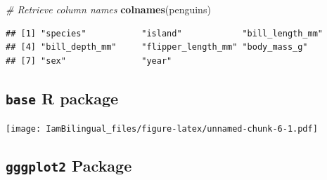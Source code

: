 \documentclass[]{book}
\newenvironment{Shaded}{\begin{snugshade}}{\end{snugshade}}
\newcommand{\CommentTok}[1]{\textcolor[rgb]{0.56,0.35,0.01}{\textit{#1}}}
\newcommand{\DataTypeTok}[1]{\textcolor[rgb]{0.13,0.29,0.53}{#1}}
\newcommand{\DecValTok}[1]{\textcolor[rgb]{0.00,0.00,0.81}{#1}}
\newcommand{\KeywordTok}[1]{\textcolor[rgb]{0.13,0.29,0.53}{\textbf{#1}}}
\newcommand{\NormalTok}[1]{#1}
\newcommand{\OperatorTok}[1]{\textcolor[rgb]{0.81,0.36,0.00}{\textbf{#1}}}
\newcommand{\StringTok}[1]{\textcolor[rgb]{0.31,0.60,0.02}{#1}}
\begin{document}
\begin{Shaded}
\begin{Highlighting}[]
\CommentTok{# Retrieve column names}
\KeywordTok{colnames}\NormalTok{(penguins)}
\end{Highlighting}
\end{Shaded}

\begin{verbatim}
## [1] "species"           "island"            "bill_length_mm"   
## [4] "bill_depth_mm"     "flipper_length_mm" "body_mass_g"      
## [7] "sex"               "year"
\end{verbatim}

\hypertarget{base-r-package}{%
\subsection{\texorpdfstring{\texttt{base} R package}{base R package}}\label{base-r-package}}

\begin{Shaded}
\end{Shaded}

\texttt{[image: IamBilingual\_files/figure-latex/unnamed-chunk-6-1.pdf]}

\hypertarget{gggplot2-package}{%
\subsection{\texorpdfstring{\texttt{gggplot2} Package}{gggplot2 Package}}\label{gggplot2-package}}
\end{document}
